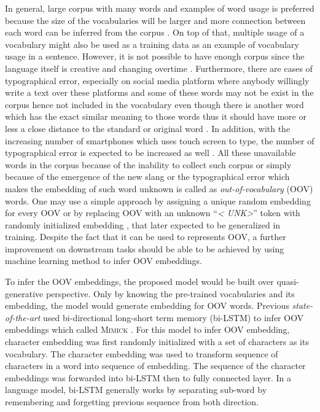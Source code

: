     In general, large corpus with many words and examples of word
    usage is preferred because the size of the vocabularies will be
    larger and more connection between each word can be inferred from
    the corpus \citep{size2018kutuzov}. On top of that, multiple usage
    of a vocabulary might also be used as a training data as an example
    of vocabulary usage in a sentence. However, it is not possible to
    have enough corpus since the language itself is creative and
    changing overtime \citep{forrester2008abrief,
    speech2009Jurafsky}. Furthermore, there are cases
    of typographical error, especially on social media platform where
    anybody willingly write a text over these platforms
    \citep{Liu2010SentimentAA} and some of these words may not be
    exist in the corpus hence not included in the vocabulary even
    though there is another word which has the exact similar meaning to
    those words thus it should have more or less a close distance to the
    standard or original word \citep{mapping2012eisenstein}. In
    addition, with the increasing number of smartphones which uses
    touch screen to type, the number of typographical error is
    expected to be increased as well \citep{ghosh2017correction}. All
    these unavailable words in the corpus because of the inability to
    collect such corpus or simply because of the emergence of the new slang or
    the typographical error which makes the embedding of such word unknown
    is called as \textit{out-of-vocabulary} (OOV) words. One
    may use a simple approach by assigning a unique random embedding for
    every OOV or by replacing OOV with an unknown ``\textit{\textless
    UNK\textgreater}'' token with randomly initialized embedding
    \citep{predicting2019garneau}, that later expected to be generalized
    in training. Despite the fact that it can be used to represents
    OOV, a further improvement on downstream tasks should be able to be
    achieved by using machine learning method to infer OOV embeddings.

    To infer the OOV embeddings, the proposed model would be built
    over quasi-generative perspective. Only by knowing the pre-trained
    vocabularies and its embedding, the model would generate embedding
    for OOV words. Previous \textit{state-of-the-art} used
    bi-directional long-short term memory (bi-LSTM) to infer OOV
    embeddings which called \textsc{Mimick} \citep{mimicking2017Pinter}. For
    this model to infer OOV embedding, character embedding was first
    randomly initialized with a set of characters as its vocabulary.
    The character embedding was used to transform sequence of
    characters in a word into sequence of embedding. The sequence of
    the character embeddings was forwarded into bi-LSTM then to fully
    connected layer. In a language model, bi-LSTM generally works by
    separating sub-word by remembering and forgetting previous
    sequence from both direction. 
    
